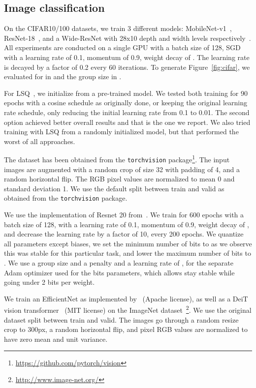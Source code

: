 \subsection{Image classification}
\label{supp:image}

On the CIFAR10/100 datasets, we train 3 different models: MobileNet-v1~\citep{howard2017mobilenets}, ResNet-18~\citep{he2016deep}, and a Wide-ResNet with 28x10 depth and width levels respectively~\citep{zagoruyko2016wide}.
All experiments are conducted on a single GPU with a batch size of 128, SGD with a learning rate of 0.1, momentum of 0.9,
weight decay of . The learning rate is decayed by a factor of 0.2 every 60 iterations.
To generate Figure~\ref{fig:cifar}, we evaluated \diffq for  in 
and the group size  in .

For LSQ~\citep{esser2020learned}, we initialize from a pre-trained model. We tested both training for 90 epochs with a cosine schedule as originally done, or keeping the original learning rate schedule, only reducing the initial learning rate from 0.1 to 0.01. The second option achieved better overall results and that is the one we report.
We also tried training with LSQ from a randomly initialized model, but that performed the worst of all approaches.

The dataset has been obtained from the \texttt{torchvision} package\footnote{\url{https://github.com/pytorch/vision}}.
The input images are augmented with a random crop of size 32 with padding of 4, and a random horizontal flip.
The RGB pixel values are normalized to mean 0 and standard deviation 1. We use the default split between
train and valid as obtained from the \texttt{torchvision} package.

We use the implementation of Resnet 20 from~\citet{Idelbayev18a}.
We train for 600 epochs with a batch size of 128, with a learning rate of 0.1, momentum of 0.9, weight decay of , and decrease the learning rate by a factor of 10, every 200 epochs.
We quantize all parameters except biases, we set the minimum number of bits to  as we observe this was stable for this particular task, and lower the maximum number of bits to . We use a group size  and a penalty  and a learning rate of , for the separate Adam optimizer used for the bits parameters, which allows stay stable while going under 2 bits per weight.

We train an EfficientNet as implemented by~\citep{rw2019timm} (Apache license),
as well as a DeiT vision transformer~\citep{touvron2020training} (MIT license) on the ImageNet dataset~\cite{imagenet_cvpr09}\footnote{\url{http://www.image-net.org/}}. We use the original dataset
split between train and valid. 
The images go through a random resize crop to 300px, a random horizontal flip, and pixel RGB values are normalized
to have zero mean and unit variance.

